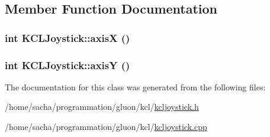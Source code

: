 \subsection{Member Function Documentation}
\hypertarget{class_k_c_l_joystick_70988b3702bf410f86a66fb1277913fd}{
\subsubsection[{axisX}]{\setlength{\rightskip}{0pt plus 5cm}int KCLJoystick::axisX ()}}
\label{class_k_c_l_joystick_70988b3702bf410f86a66fb1277913fd}


\hypertarget{class_k_c_l_joystick_0055ef283714ae8545021761e2903376}{
\subsubsection[{axisY}]{\setlength{\rightskip}{0pt plus 5cm}int KCLJoystick::axisY ()}}
\label{class_k_c_l_joystick_0055ef283714ae8545021761e2903376}




The documentation for this class was generated from the following files:\begin{CompactItemize}
\item 
/home/sacha/programmation/gluon/kcl/\hyperlink{kcljoystick_8h}{kcljoystick.h}\item 
/home/sacha/programmation/gluon/kcl/\hyperlink{kcljoystick_8cpp}{kcljoystick.cpp}\end{CompactItemize}
